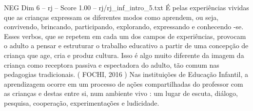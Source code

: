 \begin{textsample}{NEG Dim 6 – rj – Score 1.00 – rj/rj\_inf\_intro\_5.txt}
É pelas experiências vividas que as crianças expressam os diferentes modos como aprendem, ou seja, convivendo, brincando, participando, explorando, expressando e conhecendo -se.
Esses verbos, que se repetem em cada um dos campos de experiências, provocam o adulto a pensar e estruturar o trabalho educativo a partir de uma concepção de criança que age, cria e produz cultura.
Isso é algo muito diferente da imagem da criança como receptora passiva e espectadora do adulto, tão comum nas pedagogias tradicionais. ( FOCHI, 2016 ) Nas instituições de Educação Infantil, a aprendizagem ocorre em um processo de ações compartilhadas do professor com as crianças e destas entre si, num ambiente vivo : um lugar de escuta, diálogo, pesquisa, cooperação, experimentações e ludicidade.

\end{textsample}
